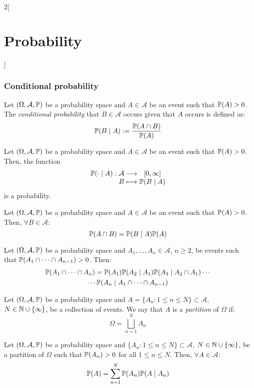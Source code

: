 \documentclass[../../../main_math.tex]{subfiles}
\begin{document}
\begin{multicols}{2}[\section{Probability}]
  \subsubsection{Conditional probability}
  \begin{definition}
    Let $(\Omega,\mathcal{A},\mathbb{P})$ be a probability space and $A\in\mathcal{A}$ be an event such that $\mathbb{P}(A)>0$. The \emph{conditional probability} that $B\in\mathcal{A}$ occurs given that $A$ occurs is defined as: $$\mathbb{P}(B\mid A):=\frac{\mathbb{P}(A\cap B)}{\mathbb{P}(A)}$$
  \end{definition}
  \begin{proposition}
    Let $(\Omega,\mathcal{A},\mathbb{P})$ be a probability space and $A\in\mathcal{A}$ be an event such that $\mathbb{P}(A)>0$. Then, the function
    $$
      \function{\Prob(\cdot\mid A)}{\mathcal{A}}{[0,\infty]}{B}{\Prob(B\mid A)}
    $$
    is a probability.
  \end{proposition}
  \begin{proposition}
    Let $(\Omega,\mathcal{A},\mathbb{P})$ be a probability space and $A\in\mathcal{A}$ be an event such that $\mathbb{P}(A)>0$. Then, $\forall B\in\mathcal{A}$: $$\mathbb{P}(A\cap B)=\mathbb{P}(B\mid A)\mathbb{P}(A)$$
  \end{proposition}
  \begin{proposition}\label{P:compound}
    Let $(\Omega,\mathcal{A},\mathbb{P})$ be a probability space and $A_1,\ldots,A_n\in\mathcal{A}$, $n\geq 2$, be events such that $\mathbb{P}(A_1\cap\cdots\cap A_{n-1})>0$. Then:
    \begin{multline*}
      \mathbb{P}(A_1\cap\cdots\cap A_n)=\mathbb{P}(A_1)\mathbb{P}(A_2\mid A_1)\mathbb{P}(A_3\mid A_2\cap A_1)\cdots\\\cdots \mathbb{P}(A_n\mid A_1\cap\cdots\cap A_{n-1})
    \end{multline*}
  \end{proposition}
  \begin{definition}
    Let $(\Omega,\mathcal{A},\mathbb{P})$ be a probability space and $A=\{A_n:1\leq n\leq N\}\subset\mathcal{A}$, $N\in\mathbb{N}\cup\{\infty\}$, be a collection of events. We say that $A$ is a \emph{partition} of $\Omega$ if: $$\Omega=\bigsqcup_{n=1}^NA_n$$
  \end{definition}
  \begin{proposition}\label{P:totalprob}
    Let $(\Omega,\mathcal{A},\mathbb{P})$ be a probability space and $\{A_n:1\leq n\leq N\}\subset\mathcal{A}$, $N\in\mathbb{N}\cup\{\infty\}$, be a partition of $\Omega$ such that $\mathbb{P}(A_n)>0$ for all $1\leq n\leq N$. Then, $\forall A\in\mathcal{A}$: $$\mathbb{P}(A)=\sum_{n=1}^N\mathbb{P}(A_n)\mathbb{P}(A\mid A_n)$$

\end{proposition}
\end{multicols}
\end{document}
